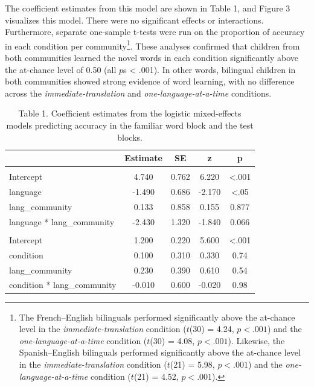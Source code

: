 \documentclass[
  man,floatsintext]{apa7}
\begin{document}
\noindent The coefficient estimates from this model are shown in Table 1, and Figure 3 visualizes this model. There were no significant effects or interactions. Furthermore, separate one-sample t-tests were run on the proportion of accuracy in each condition per community\footnote{The French--English bilinguals performed significantly above the at-chance level in the \emph{immediate-translation} condition (\(t\)(30) = 4.24, \(p < .001\)) and the \emph{one-language-at-a-time} condition (\(t\)(30) = 4.08, \(p < .001\)). Likewise, the Spanish--English bilinguals performed significantly above the at-chance level in the \emph{immediate-translation} condition (\(t\)(21) = 5.98, \(p < .001\)) and the \emph{one-language-at-a-time} condition (\(t\)(21) = 4.52, \(p < .001\)).}. These analyses confirmed that children from both communities learned the novel words in each condition significantly above the at-chance level of 0.50 (all \(p\)s \textless{} .001). In other words, bilingual children in both communities showed strong evidence of word learning, with no difference across the \emph{immediate-translation} and \emph{one-language-at-a-time} conditions.

\begin{table}

\caption{\label{tab:unnamed-chunk-8}Table 1. Coefficient estimates from the logistic mixed-effects models predicting accuracy in the familiar word block and the test blocks.}
\centering
\fontsize{12}{14}\selectfont
\begin{tabular}[t]{lcccc}
\toprule
  & Estimate & SE & z & p\\
\midrule
\addlinespace[0.3em]
\multicolumn{5}{l}{\textbf{Familiar word block}}\\
\hspace{1em}Intercept & 4.740 & 0.762 & 6.220 & <.001\\
\hspace{1em}language & -1.490 & 0.686 & -2.170 & <.05\\
\hspace{1em}lang\_community & 0.133 & 0.858 & 0.155 & 0.877\\
\hspace{1em}language * lang\_community & -2.430 & 1.320 & -1.840 & 0.066\\
\addlinespace[0.3em]
\multicolumn{5}{l}{\textbf{Test blocks}}\\
\hspace{1em}Intercept & 1.200 & 0.220 & 5.600 & <.001\\
\hspace{1em}condition & 0.100 & 0.310 & 0.330 & 0.74\\
\hspace{1em}lang\_community & 0.230 & 0.390 & 0.610 & 0.54\\
\hspace{1em}condition * lang\_community & -0.010 & 0.600 & -0.020 & 0.98\\
\bottomrule
\end{tabular}
\end{table}
\end{document}
